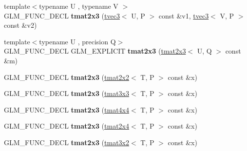 \begin{DoxyCompactItemize}
\item 
\hypertarget{structglm_1_1tmat2x3_a7155a096b04a8577bbfc344a163b07c5}{{\footnotesize template$<$typename U , typename V $>$ }\\G\-L\-M\-\_\-\-F\-U\-N\-C\-\_\-\-D\-E\-C\-L {\bfseries tmat2x3} (\hyperlink{structglm_1_1tvec3}{tvec3}$<$ U, P $>$ const \&v1, \hyperlink{structglm_1_1tvec3}{tvec3}$<$ V, P $>$ const \&v2)}\label{structglm_1_1tmat2x3_a7155a096b04a8577bbfc344a163b07c5}

\item 
\hypertarget{structglm_1_1tmat2x3_a5cd6c10b4d3a99be39f63ccbcc57b210}{{\footnotesize template$<$typename U , precision Q$>$ }\\G\-L\-M\-\_\-\-F\-U\-N\-C\-\_\-\-D\-E\-C\-L G\-L\-M\-\_\-\-E\-X\-P\-L\-I\-C\-I\-T {\bfseries tmat2x3} (\hyperlink{structglm_1_1tmat2x3}{tmat2x3}$<$ U, Q $>$ const \&m)}\label{structglm_1_1tmat2x3_a5cd6c10b4d3a99be39f63ccbcc57b210}

\item 
\hypertarget{structglm_1_1tmat2x3_a4b2209e3935a196c939a0f6d1dd8c575}{G\-L\-M\-\_\-\-F\-U\-N\-C\-\_\-\-D\-E\-C\-L {\bfseries tmat2x3} (\hyperlink{structglm_1_1tmat2x2}{tmat2x2}$<$ T, P $>$ const \&x)}\label{structglm_1_1tmat2x3_a4b2209e3935a196c939a0f6d1dd8c575}

\item 
\hypertarget{structglm_1_1tmat2x3_a35bb32e0a6a4b992999030d3954c97aa}{G\-L\-M\-\_\-\-F\-U\-N\-C\-\_\-\-D\-E\-C\-L {\bfseries tmat2x3} (\hyperlink{structglm_1_1tmat3x3}{tmat3x3}$<$ T, P $>$ const \&x)}\label{structglm_1_1tmat2x3_a35bb32e0a6a4b992999030d3954c97aa}

\item 
\hypertarget{structglm_1_1tmat2x3_aee098b309b123085b754074afb35482f}{G\-L\-M\-\_\-\-F\-U\-N\-C\-\_\-\-D\-E\-C\-L {\bfseries tmat2x3} (\hyperlink{structglm_1_1tmat4x4}{tmat4x4}$<$ T, P $>$ const \&x)}\label{structglm_1_1tmat2x3_aee098b309b123085b754074afb35482f}

\item 
\hypertarget{structglm_1_1tmat2x3_a239421173e883442b6fad327f9cf722d}{G\-L\-M\-\_\-\-F\-U\-N\-C\-\_\-\-D\-E\-C\-L {\bfseries tmat2x3} (\hyperlink{structglm_1_1tmat2x4}{tmat2x4}$<$ T, P $>$ const \&x)}\label{structglm_1_1tmat2x3_a239421173e883442b6fad327f9cf722d}

\item 
\hypertarget{structglm_1_1tmat2x3_a01a134e82495bf18ab7e92d53fd711ca}{G\-L\-M\-\_\-\-F\-U\-N\-C\-\_\-\-D\-E\-C\-L {\bfseries tmat2x3} (\hyperlink{structglm_1_1tmat3x2}{tmat3x2}$<$ T, P $>$ const \&x)}\label{structglm_1_1tmat2x3_a01a134e82495bf18ab7e92d53fd711ca}


\end{DoxyCompactItemize}

